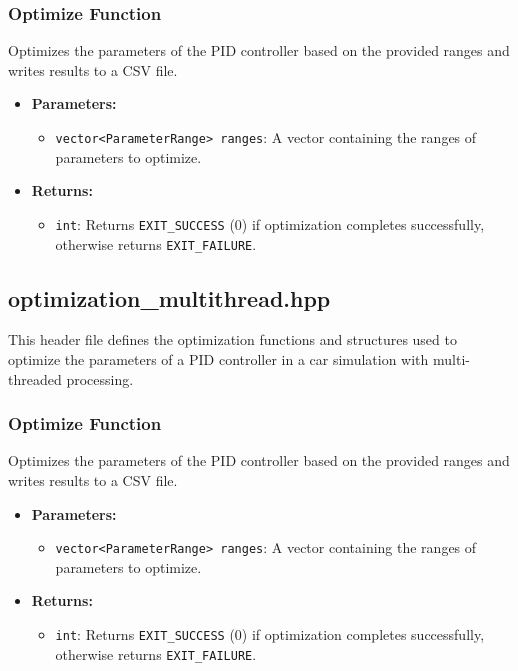 \documentclass[a4paper,12pt]{article}
\begin{document}
\subsubsection{Optimize Function}
Optimizes the parameters of the PID controller based on the provided ranges and writes results to a CSV file.
\begin{itemize}
\item \textbf{Parameters:}
\begin{itemize}
\item \texttt{vector<ParameterRange> ranges}: A vector containing the ranges of parameters to optimize.
\end{itemize}
\item \textbf{Returns:}
\begin{itemize}
\item \texttt{int}: Returns \texttt{EXIT\_SUCCESS} (0) if optimization completes successfully, otherwise returns \texttt{EXIT\_FAILURE}.
\end{itemize}
\end{itemize}
\subsection{optimization\_multithread.hpp}
This header file defines the optimization functions and structures used to optimize the parameters of a PID controller in a car simulation with multi-threaded processing.

\subsubsection{Optimize Function}
Optimizes the parameters of the PID controller based on the provided ranges and writes results to a CSV file.
\begin{itemize}
\item \textbf{Parameters:}
\begin{itemize}
\item \texttt{vector<ParameterRange> ranges}: A vector containing the ranges of parameters to optimize.
\end{itemize}
\item \textbf{Returns:}
\begin{itemize}
\item \texttt{int}: Returns \texttt{EXIT\_SUCCESS} (0) if optimization completes successfully, otherwise returns \texttt{EXIT\_FAILURE}.
\end{itemize}
\end{itemize}
\end{document}
